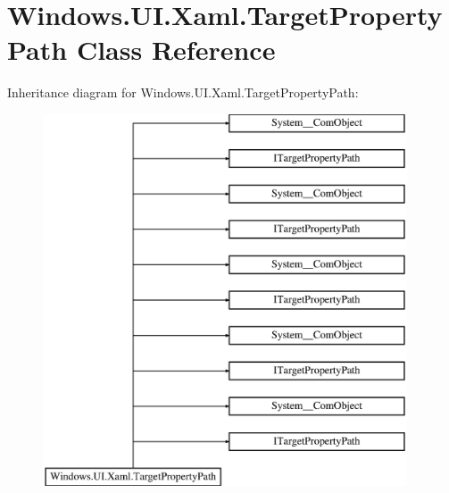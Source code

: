 \hypertarget{class_windows_1_1_u_i_1_1_xaml_1_1_target_property_path}{}\section{Windows.\+U\+I.\+Xaml.\+Target\+Property\+Path Class Reference}
\label{class_windows_1_1_u_i_1_1_xaml_1_1_target_property_path}
Inheritance diagram for Windows.\+U\+I.\+Xaml.\+Target\+Property\+Path\+:\begin{figure}[H]
\begin{center}
\leavevmode
\includegraphics[height=11.000000cm]{class_windows_1_1_u_i_1_1_xaml_1_1_target_property_path}
\end{center}
\end{figure}
